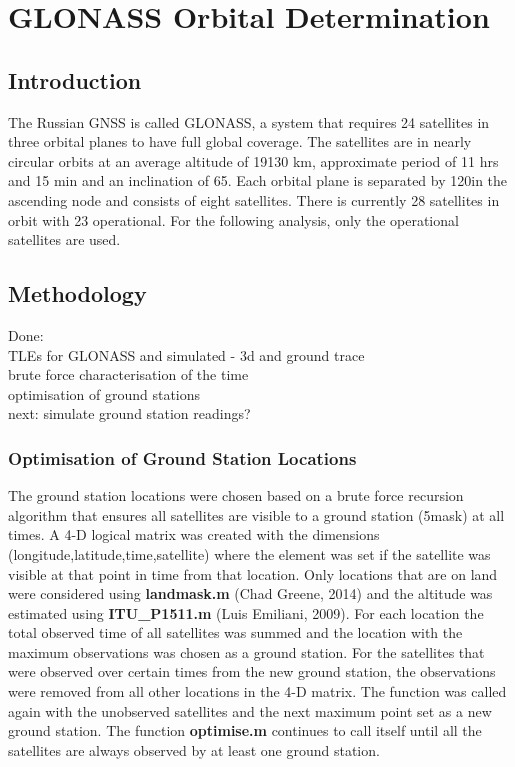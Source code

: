 \documentclass[Space3_Assign2]{subfile}
\begin{document}
\section{GLONASS Orbital Determination}
\subsection{Introduction}
The Russian GNSS is called GLONASS, a system that requires 24 satellites in three orbital planes to have full global coverage. The satellites are in nearly circular orbits at an average altitude of 19130 km, approximate period of 11 hrs and 15 min and an inclination of 65\Deg. Each orbital plane is separated by 120\Deg in the ascending node and consists of eight satellites. There is currently 28 satellites in orbit with 23 operational. For the following analysis, only the operational satellites are used.
\subsection{Methodology}

Done:\\
TLEs for GLONASS and simulated - 3d and ground trace\\
brute force characterisation of the time \\
optimisation of ground stations \\

next:
simulate ground station readings?\\


\subsubsection{Optimisation of Ground Station Locations}
The ground station locations were chosen based on a brute force recursion algorithm that ensures all satellites are visible to a ground station (5\Deg mask) at all times. A 4-D logical matrix was created with the dimensions (longitude,latitude,time,satellite) where the element was set if the satellite was visible at that point in time from that location. Only locations that are on land were considered using \textbf{landmask.m} (Chad Greene, 2014) and the altitude was estimated using \textbf{ITU\_P1511.m} (Luis Emiliani, 2009). For each location the total observed time of all satellites was summed and the location with the maximum observations was chosen as a ground station. For the satellites that were observed over certain times from the new ground station, the observations were removed from all other locations in the 4-D matrix. The function was called again with the unobserved satellites and the next maximum point set as a new ground station. The function \textbf{optimise.m} continues to call itself until all the satellites are always observed by at least one ground station. 
\end{document}
